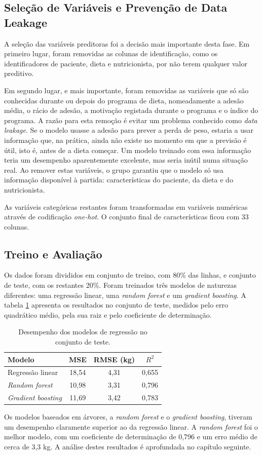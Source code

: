 \subsection{Seleção de Variáveis e Prevenção de Data Leakage}
A seleção das variáveis preditoras foi a decisão mais importante desta fase. Em primeiro lugar, foram removidas as colunas de identificação, como os identificadores de paciente, dieta e nutricionista, por não terem qualquer valor preditivo.

Em segundo lugar, e mais importante, foram removidas as variáveis que só são conhecidas durante ou depois do programa de dieta, nomeadamente a adesão média, o rácio de adesão, a motivação registada durante o programa e o índice do programa. A razão para esta remoção é evitar um problema conhecido como \textit{data leakage}. Se o modelo usasse a adesão para prever a perda de peso, estaria a usar informação que, na prática, ainda não existe no momento em que a previsão é útil, isto é, antes de a dieta começar. Um modelo treinado com essa informação teria um desempenho aparentemente excelente, mas seria inútil numa situação real. Ao remover estas variáveis, o grupo garantiu que o modelo só usa informação disponível à partida: características do paciente, da dieta e do nutricionista.

As variáveis categóricas restantes foram transformadas em variáveis numéricas através de codificação \textit{one-hot}. O conjunto final de características ficou com 33 colunas.

\subsection{Treino e Avaliação}
Os dados foram divididos em conjunto de treino, com 80\% das linhas, e conjunto de teste, com os restantes 20\%. Foram treinados três modelos de naturezas diferentes: uma regressão linear, uma \textit{random forest} e um \textit{gradient boosting}. A tabela \ref{tab:reg} apresenta os resultados no conjunto de teste, medidos pelo erro quadrático médio, pela sua raiz e pelo coeficiente de determinação.

\begin{table}[h]
\centering
\begin{tabular}{|l|c|c|c|}
\hline
\textbf{Modelo} & \textbf{MSE} & \textbf{RMSE (kg)} & \textbf{$R^2$} \\
\hline
Regressão linear & 18,54 & 4,31 & 0,655 \\
\textit{Random forest} & 10,98 & 3,31 & 0,796 \\
\textit{Gradient boosting} & 11,69 & 3,42 & 0,783 \\
\hline
\end{tabular}
\caption{Desempenho dos modelos de regressão no conjunto de teste.}
\label{tab:reg}
\end{table}

Os modelos baseados em árvores, a \textit{random forest} e o \textit{gradient boosting}, tiveram um desempenho claramente superior ao da regressão linear. A \textit{random forest} foi o melhor modelo, com um coeficiente de determinação de 0,796 e um erro médio de cerca de 3,3 kg. A análise destes resultados é aprofundada no capítulo seguinte.
